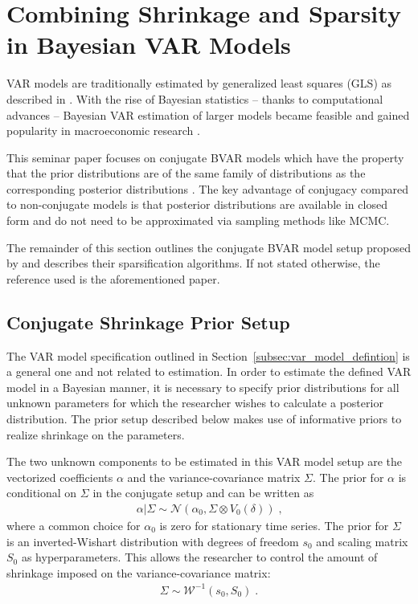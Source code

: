 \section{Combining Shrinkage and Sparsity in Bayesian VAR Models}
\label{sec:combining_shrinkage_and_sparsity}
VAR models are traditionally estimated by generalized least squares (GLS) as described in \textcite[pp.~69~ff.]{lutkepohl_new_2005}. With the rise of Bayesian statistics -- thanks to computational advances -- Bayesian VAR estimation of larger models became feasible and gained popularity in macroeconomic research \parencite[p.~269]{koop_bayesian_2009}.

This seminar paper focuses on conjugate BVAR models which have the property that the prior distributions are of the same family of distributions as the corresponding posterior distributions \parencite[pp.~35~f.]{gelman_bayesian_2013}. The key advantage of conjugacy compared to non-conjugate models is that posterior distributions are available in closed form and do not need to be approximated via sampling methods like MCMC.

The remainder of this section outlines the conjugate BVAR model setup proposed by \textcite{hauzenberger_combining_2021} and describes their sparsification algorithms. If not stated otherwise, the reference used is the aforementioned paper.

\subsection{Conjugate Shrinkage Prior Setup}
\label{subsec:prior_setup}
The VAR model specification outlined in Section~\ref{subsec:var_model_defintion} is a general one and not related to estimation. In order to estimate the defined VAR model in a Bayesian manner, it is necessary to specify prior distributions for all unknown parameters for which the researcher wishes to calculate a posterior distribution. The prior setup described below makes use of informative priors to realize shrinkage on the parameters.

The two unknown components to be estimated in this VAR model setup are the vectorized coefficients $\alpha$ and the variance-covariance matrix $\Sigma$. The prior for $\alpha$ is conditional on $\Sigma$ in the conjugate setup and can be written as
\begin{align}
    \label{eq:alpha_prior}
    \alpha | \Sigma \sim \mathcal{N}(\alpha_0 , \Sigma \otimes V_0(\delta)) \; \text{,}
\end{align}
where a common choice for $\alpha_0$ is zero for stationary time series. The prior for $\Sigma$ is an inverted-Wishart distribution with degrees of freedom $s_0$ and scaling matrix $S_0$ as hyperparameters. This allows the researcher to control the amount of shrinkage imposed on the variance-covariance matrix:
\begin{align}
    \label{eq:sigma_prior}
    \Sigma \sim \mathcal{W}^{-1}(s_0 , S_0) \; \text{.}
\end{align}

